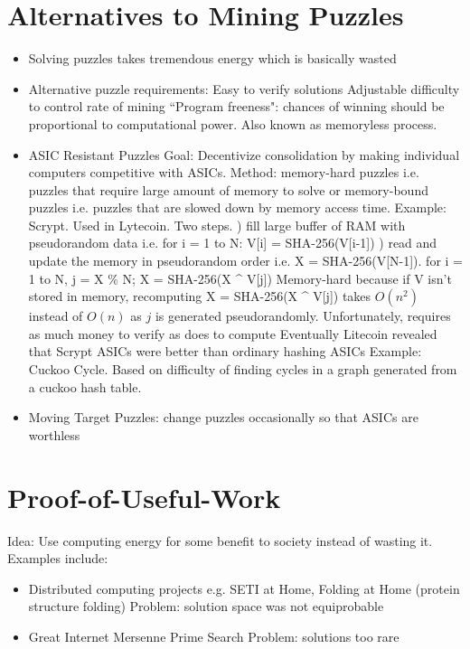 \documentclass{article}
\begin{document}
\section{Alternatives to Mining Puzzles}
\begin{itemize}
\item Solving puzzles takes tremendous energy which is basically wasted
\item Alternative puzzle requirements:
\subitem Easy to verify solutions
\subitem Adjustable difficulty to control rate of mining
\subitem ``Program freeness": chances of winning should be proportional to computational power. Also known as memoryless process.
\item ASIC Resistant Puzzles
\subitem Goal: Decentivize consolidation by making individual computers competitive with ASICs.
\subitem Method: memory-hard puzzles i.e. puzzles that require large amount of memory to solve or memory-bound puzzles i.e. puzzles that are slowed down by memory access time.
\subitem Example: Scrypt. Used in Lytecoin. Two steps. 
) fill large buffer of RAM with pseudorandom data i.e. for i = 1 to N: V[i] = SHA-256(V[i-1])
) read and update the memory in pseudorandom order i.e. X = SHA-256(V[N-1]). for i = 1 to N, {j = X \% N; X = SHA-256(X \string^ V[j])}
\subsubitem Memory-hard because if V isn't stored in memory, recomputing X = SHA-256(X \string^ V[j]) takes $O(n^2)$ instead of $O(n)$ as $j$ is generated pseudorandomly.
\subsubitem Unfortunately, requires as much money to verify as does to compute
\subsubitem Eventually Litecoin revealed that Scrypt ASICs were better than ordinary hashing ASICs
\subitem Example: Cuckoo Cycle. Based on difficulty of finding cycles in a graph generated from a cuckoo hash table.
\item Moving Target Puzzles: change puzzles occasionally so that ASICs are worthless
\end{itemize}

\section{Proof-of-Useful-Work}
Idea: Use computing energy for some benefit to society instead of wasting it. Examples include:
\begin{itemize}
\item Distributed computing projects e.g. SETI at Home, Folding at Home (protein structure folding)
\subitem Problem: solution space was not equiprobable
\item Great Internet Mersenne Prime Search
\subitem Problem: solutions too rare
\end{itemize}
\end{document}

